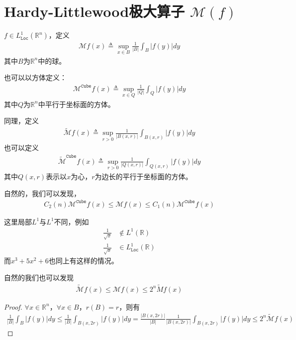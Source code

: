 \newpage
\section{Hardy-Littlewood极大算子 $\mathcal{M}(f)$}
\begin{definition}
    $f\in L^1_{\texttt{Loc}} (\mathbb{R}^n)$，定义
    \begin{align*}
        \mathcal{M}f(x) \triangleq \sup\limits_{x\in B} \frac{1}{|B|} \int_{B} |f(y)| dy
    \end{align*}
    其中$B$为$\mathbb{R}^n$中的球。

    也可以以方体定义：
    \begin{align*}
        \mathcal{M}^{\texttt{Cube}}f(x) \triangleq \sup\limits_{x\in Q} \frac{1}{|Q|} \int_{Q} |f(y)| dy
    \end{align*}
    其中$Q$为$\mathbb{R}^n$中平行于坐标面的方体。

    同理，定义
    \begin{align*}
        \widetilde{\mathcal{M}}f(x) \triangleq \sup\limits_{r>0} \frac{1}{|B(x,r)|} \int_{B(x,r)} |f(y)| dy
    \end{align*}
    也可以定义
    \begin{align*}
        \widetilde{\mathcal{M}}^{\texttt{Cube}}f(x) \triangleq \sup\limits_{r>0} \frac{1}{|Q(x,r)|} \int_{Q(x,r)} |f(y)| dy
    \end{align*}
    其中$Q(x,r)$表示以$x$为心，$r$为边长的平行于坐标面的方体。
\end{definition}
\begin{remark}
    自然的，我们可以发现，
    \begin{align*}
        C_2(n) \mathcal{M}^{\texttt{Cube}} f(x) \leqslant \mathcal{M}f(x) \leqslant C_1(n) \mathcal{M}^{\texttt{Cube}} f(x)
    \end{align*}

    这里局部$L^1$与$L^1$不同，例如
    \begin{align*}
        \frac{1}{\sqrt{x}} &\notin L^1(\mathbb{R}) \\
        \frac{1}{\sqrt{x}} &\in L^1_{\texttt{Loc}}(\mathbb{R})
    \end{align*}
    而$x^3 + 5x^2 + 6$也同上有这样的情况。
\end{remark}
\begin{remark}
    自然的我们也可以发现
    \begin{align*}
        \widetilde{\mathcal{M}}f(x) \leqslant \mathcal{M}f(x) \leqslant 2^n \widetilde{M}f(x)
    \end{align*}
\end{remark}
\begin{proof}
    $\forall x\in\mathbb{R}^n$，$\forall x\in B$，$r(B) = r$，则有
    \begin{align*}
        \frac{1}{|B|} \int_B |f(y)| dy \leqslant \frac{1}{|B|} \int_{B(x,2r)} |f(y)| dy = \frac{|B(x,2r)|}{|B|} \frac{1}{|B(x,2r)|} \int_{B(x,2r)} |f(y)| dy \leqslant 2^n \widetilde{\mathcal{M}} f(x)
    \end{align*}
\end{proof}


